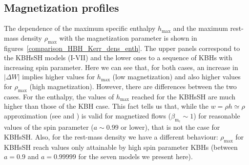 \documentclass[twocolumn,aps,showpacs,showkeys,prd,superscriptaddress,byrevtex, amsmath]{revtex4-1}
\begin{document}




\subsection{Magnetization profiles}

The dependence of the maximum specific enthalpy $h_{\mathrm{max}}$ and the maximum rest-mass density $\rho_{\mathrm{max}}$ with the magnetization parameter is shown in figures~\ref{comparison_HBH_Kerr_dens_enth}. The upper panels correspond to the KBHsSH models (I-VII) and the lower ones to a sequence of KBHs with increasing spin parameter.  Here we can see that, for both cases, an increase in $|\Delta W|$ implies higher values for $h_{\mathrm{max}}$ (low magnetization) and also higher values for $\rho_{\mathrm{max}}$ (high magnetization). However, there are differences between the two cases. For the enthalpy, the values of $h_{\mathrm{max}}$ reached for the KBHsSH are much higher than those of the KBH case. This fact tells us that, while the $w = \rho h \simeq \rho$ approximation (see \cite{Komissarov:2006} and \cite{Gimeno-Soler:2017}) is valid for magnetized flows ($\beta_{\mathrm{m_c}} \sim 1$) for reasonable values of the spin parameter ($a \sim 0.99$ or lower), that is not the case for KBHsSH. Also, for the rest-mass density we have a different behaviour: $\rho_{\mathrm{max}}$ for KBHsSH reach values only attainable by high spin parameter KBHs (between $a = 0.9$ and $a = 0.99999$ for the seven models we present here).
\end{document}

